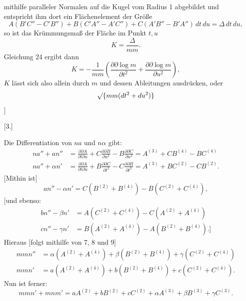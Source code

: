%
\noindent mithilfe paralleler Normalen auf die Kugel vom Radius 1 abgebildet und entspricht ihm dort ein Flächenelement der Größe
\[
A(B'C''-C'B'')+B(C'A''-A'C'')+C(A'B''-B'A'')\,dt\,du=\Delta\,dt\,du,
\]
so ist das Krümmungsmaß der Fläche im Punkt $t,u$
\[
K=\frac{\Delta}{mm}.
\]
Gleichung 24 ergibt dann
\begin{equation}\tag*{[25]}
K=-\frac1{mm}\left(\frac{\partial\partial\log m}{\partial t^2}+\frac{\partial\partial\log m}{\partial u^2}\right),
\end{equation}
$K$ lässt sich also allein durch $m$ und dessen Ableitungen ausdrücken, oder 
\[
\mathord{\surd}\{mm(dt^2+du^2)\}
\]
]
\begin{center}[3.]\end{center}
\noindent\hspace*{1.2em} Die Differentiation von $na$ und $n\alpha$ gibt:
\[
\begin{aligned}
na''+an''&=\frac{\partial\partial A}{\partial t\partial u}+C\frac{\partial\partial B}{\partial u^2}-B\frac{\partial\partial C}{\partial u^2}=A^{(3)}+CB^{(4)}-BC^{(4)}\\
na''+\alpha n'&=\frac{\partial\partial A}{\partial t\partial u}+B\frac{\partial\partial C}{\partial t^2}-C\frac{\partial\partial B}{\partial t^2}=A^{(3)}+BC^{(2)}-CB^{(2)}.
\end{aligned}
\]
[Mithin ist]
\[
an''-\alpha n'=C(B^{(2)}+B^{(4)})-B(C^{(2)}+C^{(4)}),
\]
[und ebenso:
\[
\begin{aligned}
bn''-\beta n'&=A(C^{(2)}+C^{(4)})-C(A^{(2)}+A^{(4)})\\
cn''-\gamma n'&=B(A^{(2)}+A^{(4)})-A(B^{(2)}+B^{(4)}).]
\end{aligned}
\]
Hieraus [folgt mithilfe von 7, 8 und 9]
\[
\begin{aligned}
mmn''&=\alpha(A^{(2)}+A^{(4)})+\beta(B^{(2)}+B^{(4)})+\gamma(C^{(2)}+C^{(4)})\\
mmn'&=a(A^{(2)}+A^{(4)})+b(B^{(2)}+B^{(4)})+c(C^{(2)}+C^{(4)}).
\end{aligned}
\]
Nun ist ferner:
\[
mmn'+mnm'=aA^{(2)}+bB^{(2)}+cC^{(2)}+\alpha A^{(3)}+\beta B^{(3)}+\gamma C^{(3)}.
\]
